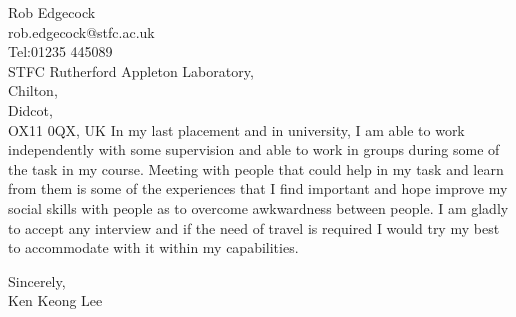 \documentclass[11pt]{letter} %
\begin{document}
\begin{letter}{Rob Edgecock\\rob.edgecock@stfc.ac.uk\\Tel:01235 445089\\STFC Rutherford Appleton Laboratory,\\Chilton,\\Didcot,\\OX11 0QX, UK}
In my last placement and in university, I am able to work independently with some supervision and able to work in groups during some of the task in my course. Meeting with people that could help in my task and learn from them is some of the experiences that I find important and hope improve my social skills with people as to overcome awkwardness between people. I am gladly to accept any interview and if the need of travel is required I would try my best to accommodate with it within my capabilities.



\closing{Sincerely,\\Ken Keong Lee}




\end{letter}
\end{document}
